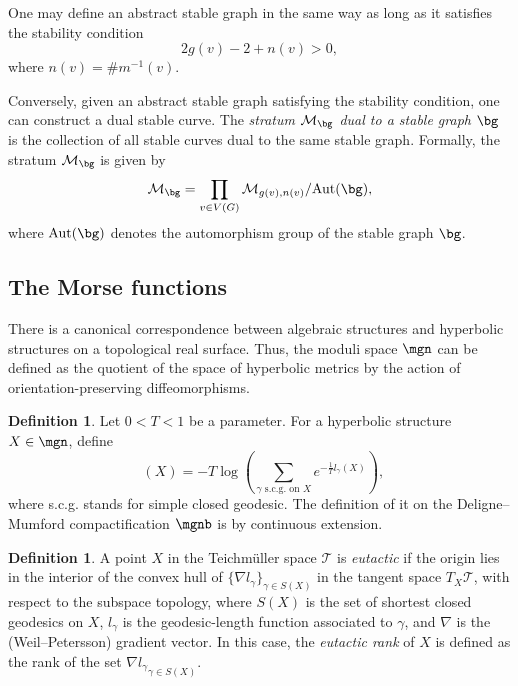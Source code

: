 \documentclass[12pt]{amsart}
\theoremstyle{remark}
\theoremstyle{definition}
\newtheorem{definition}[theorem]{Definition}
\DeclareMathOperator{\syst}{sys_T}
\numberwithin{equation}{section}
\begin{document}
One may define an abstract stable graph in the same way as long as it satisfies the stability condition
\[
2g(v)-2+n(v)>0,
\]
where $n(v)=\# m^{-1}(v)$.

Conversely, given an abstract stable graph satisfying the stability condition, one can construct a dual stable curve. The \emph{stratum $\mathcal M_\bg$ dual to a stable graph $\bg$} is the collection of all stable curves dual to the same stable graph. Formally, the stratum $\mathcal M_\bg$ is given by
\[
\mathcal M_\bg=\prod_{v\in V(G)} \mathcal M_{g(v),n(v)}/\text{Aut}(\bg),
\]
where $\text{Aut}(\bg)$ denotes the automorphism group of the stable graph $\bg$.



\subsection{The Morse functions}

There is a canonical correspondence between algebraic structures and hyperbolic structures on a topological real surface. Thus, the moduli space $\mgn$ can be defined as the quotient of the space of hyperbolic metrics by the action of orientation-preserving diffeomorphisms.

\begin{definition}
\label{syst definition}
Let $0<T<1$ be a parameter. For a hyperbolic structure $X\in\mgn$, define
\[
\syst(X)=-T\log\left(\sum_{\gamma \text{ s.c.g. on } X} e^{-\frac1Tl_\gamma(X)}\right),
\]
where s.c.g. stands for simple closed geodesic. The definition of it on the Deligne--Mumford compactification $\mgnb$ is by continuous extension.
\end{definition}



\begin{definition}
\label{eutacticity definition}
    A point $X$ in the Teichmüller space $\mathcal T$ is \emph{eutactic} if the origin lies in the interior of the convex hull of $\{\nabla l_\gamma\}_{\gamma\in S(X)}$ in the tangent space $T_X\mathcal T$, with respect to the subspace topology, where $S(X)$ is the set of shortest closed geodesics on $X$, $l_\gamma$ is the geodesic-length function associated to $\gamma$, and $\nabla$ is the (Weil--Petersson) gradient vector. In this case, the \emph{eutactic rank} of $X$ is defined as the rank of the set ${\nabla l_\gamma}_{\gamma\in S(X)}$.
\end{definition}
\end{document}

